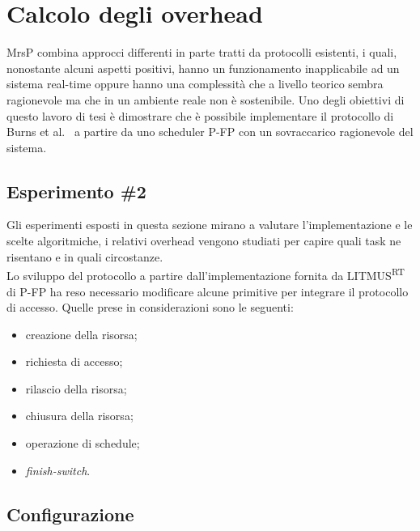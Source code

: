 \section{Calcolo degli overhead}
\label{sec:overhead}

MrsP combina approcci differenti in parte tratti da protocolli esistenti, i quali, nonostante alcuni aspetti positivi, hanno un funzionamento inapplicabile ad un sistema real-time oppure hanno una complessità che a livello teorico sembra ragionevole ma che in un ambiente reale non è sostenibile. Uno degli obiettivi di questo lavoro di tesi è dimostrare che è possibile implementare il protocollo di Burns et al.~\cite{Burns:2013:SCM:2547348.2547350} a partire da uno scheduler P-FP con un sovraccarico ragionevole del sistema.

\subsection{Esperimento \#2}
\label{sec:overhead_exp}

Gli esperimenti esposti in questa sezione mirano a valutare l'implementazione e le scelte algoritmiche, i relativi overhead vengono studiati per capire quali task ne risentano e in quali circostanze.\\

Lo sviluppo del protocollo a partire dall'implementazione fornita da LITMUS\textsuperscript{RT} di P-FP ha reso necessario modificare alcune primitive per integrare il protocollo di accesso. Quelle prese in considerazioni sono le seguenti:

\begin{itemize}
	\item creazione della risorsa;
	\item richiesta di accesso;
	\item rilascio della risorsa;
	\item chiusura della risorsa;
	\item operazione di schedule;
	\item \textit{finish-switch}.
\end{itemize}

\subsection{Configurazione}
\label{sec:overhead_conf}

